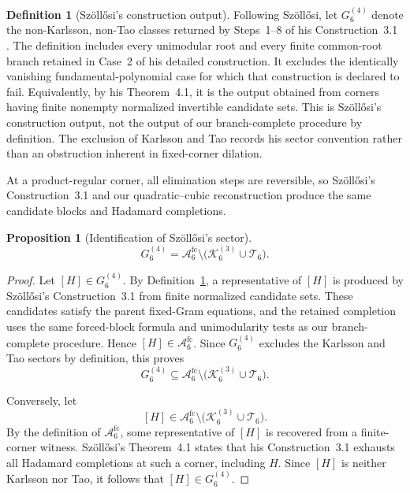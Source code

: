 \documentclass[aps,prx,reprint,nofootinbib,twoside,superscriptaddress,longbibliography,floatfix]{revtex4-2}
\newtheorem{proposition}[theorem]{Proposition}
\theoremstyle{definition}
\newtheorem{definition}[theorem]{Definition}
\newcommand{\KK}{\mathcal K}
\newcommand{\FCAtlas}{\mathcal A}
\begin{document}
\begin{definition}[Sz\"oll\H{o}si's construction output]
\label{def:historical-G-output}
Following Sz\"oll\H{o}si, let $G_6^{(4)}$ denote the non-Karlsson, non-Tao classes returned by Steps~1--8 of his Construction~3.1 \cite{Szollosi2012FourParameter}. The definition includes every unimodular root and every finite common-root branch retained in Case~2 of his detailed construction. It excludes the identically vanishing fundamental-polynomial case for which that construction is declared to fail. Equivalently, by his Theorem~4.1, it is the output obtained from corners having finite nonempty
normalized invertible candidate sets. This is Sz\"oll\H{o}si's construction
output, not the output of our branch-complete procedure by definition. The
exclusion of Karlsson and Tao records his sector convention rather than an
obstruction inherent in fixed-corner dilation.
\end{definition}

At a product-regular corner, all elimination steps are reversible, so
Sz\"oll\H{o}si's Construction~3.1 and our quadratic--cubic
reconstruction produce the same candidate blocks and Hadamard
completions.


\begin{proposition}[Identification of Sz\"oll\H{o}si's sector]
\label{prop:historical-output-identification}
\begin{equation}
G_6^{(4)}
=
\FCAtlas_6^{\mathrm{fc}}\setminus
\bigl(\KK_6^{(3)}\cup\mathcal T_6\bigr).
\label{eq:historical-output-identification}
\end{equation}
\end{proposition}

\begin{proof}
Let $[H]\in G_6^{(4)}$. By
Definition~\ref{def:historical-G-output}, a representative of
$[H]$ is produced by Sz\"oll\H{o}si's Construction~3.1 from finite
normalized candidate sets. These candidates satisfy the parent
fixed-Gram equations, and the retained completion uses the same
forced-block formula and unimodularity tests as our branch-complete
procedure. Hence $[H]\in\FCAtlas_6^{\mathrm{fc}}$. Since
$G_6^{(4)}$ excludes the Karlsson and Tao sectors by definition,
this proves
\[
G_6^{(4)}
\subseteq
\FCAtlas_6^{\mathrm{fc}}\setminus
\bigl(\KK_6^{(3)}\cup\mathcal T_6\bigr).
\]

Conversely, let
\[
[H]\in
\FCAtlas_6^{\mathrm{fc}}\setminus
\bigl(\KK_6^{(3)}\cup\mathcal T_6\bigr).
\]
By the definition of $\FCAtlas_6^{\mathrm{fc}}$, some representative
of $[H]$ is recovered from a finite-corner witness.
Sz\"oll\H{o}si's Theorem~4.1 states that his Construction~3.1
exhausts all Hadamard completions at such a corner, including $H$.
Since $[H]$ is neither Karlsson nor Tao, it follows that
$[H]\in G_6^{(4)}$.
\end{proof}
\end{document}
